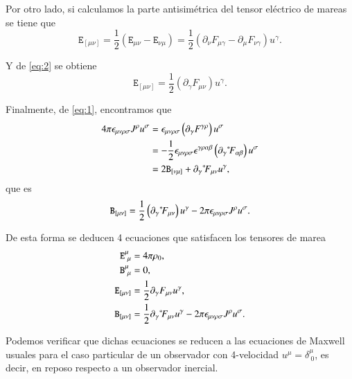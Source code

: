 Por otro lado, si calculamos la parte antisimétrica del tensor eléctrico de mareas se tiene que
\begin{equation}
\mathtt{E}_{[\mu \nu]} = \frac{1}{2} \left( \mathtt{E}_{\mu \nu} - \mathtt{E}_{\nu \mu} \right)
= \frac{1}{2} \left( \partial_{\nu} F_{\mu \gamma} - \partial_{\mu} F_{\nu \gamma} \right) u^{\gamma}.
\end{equation}

Y de \eqref{eq:2} se obtiene
\begin{equation}
\label{eq:55}
\mathtt{E}_{[\mu \nu]} = \frac{1}{2} \left( \partial_{\gamma} F_{\mu \nu} \right) u^{\gamma}.
\end{equation}

Finalmente, de \eqref{eq:1}, encontramos que
\begin{align}
4 \pi \epsilon_{\mu \nu \rho \sigma} J^{\rho} u^{\sigma} 
&= \epsilon_{\mu \nu \rho \sigma} \left( \partial_{\gamma} F^{\gamma \rho} \right) u^{\sigma} \nonumber \\
&= -\frac{1}{2} \epsilon_{\mu \nu \rho \sigma} \epsilon^{\gamma \rho \alpha \beta} \left( \partial_{\gamma} {}^*\! F_{\alpha \beta} \right) u^{\sigma} \nonumber \\
&= 2\mathtt{B}_{[\nu \mu]} + \partial_{\gamma} {}^*\! F_{\mu \nu} u^{\gamma},
\end{align}
que es
\begin{equation}
\mathtt{B}_{[\mu \nu]} = \frac{1}{2} \left( \partial_{\gamma} {}^*\! F_{\mu \nu} \right) u^{\gamma} - 2 \pi \epsilon_{\mu \nu \rho \sigma} J^{\rho} u^{\sigma}.
\end{equation}

De esta forma se deducen 4 ecuaciones que satisfacen los tensores de marea
\begin{align}
\label{eq:maxwell1}
\mathtt{E}^{\mu}_{\ \mu} &= 4 \pi \rho_0,\\
\label{eq:maxwell2}
\mathtt{B}^{\mu}_{\ \mu} &= 0,\\
\label{eq:maxwell3}
\mathtt{E}_{[\mu \nu]} &= \frac{1}{2} \partial_{\gamma} F_{\mu \nu} u^{\gamma},\\
\label{eq:maxwell4}
\mathtt{B}_{[\mu \nu]} &= \frac{1}{2}\partial_{\gamma} {}^*\! F_{\mu \nu} u^{\gamma} - 2 \pi \epsilon_{\mu \nu \rho \sigma} J^{\rho} u^{\sigma}.
\end{align}

Podemos verificar que dichas ecuaciones se reducen a las ecuaciones de Maxwell usuales para el caso particular de un observador con 4-velocidad $u^{\mu} = \delta^{\mu}_{\ 0}$, es decir, en reposo respecto a un observador inercial.

